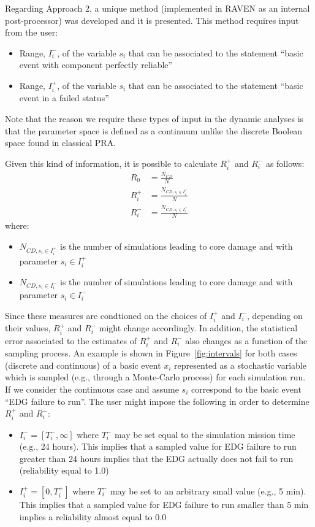 Regarding Approach 2, a unique method (implemented in RAVEN as an internal post-processor) was developed and it is 
presented. This method requires input from the user:
\begin{itemize}
  \item Range, $I_i^-$, of the variable $s_i$ that can be associated to the statement ``basic event with component perfectly reliable''
  \item Range, $I_i^+$, of the variable $s_i$ that can be associated to the statement ``basic event in a failed status''
\end{itemize}
Note that the reason we require these types of input in the dynamic analyses is that the parameter space is defined as a continuum
unlike the discrete Boolean space found in classical PRA. 

Given this kind of information, it is possible to calculate $R_i^+$ and $R_i^-$ as follows:
\begin{align} 
  R_0   &= \frac{N_{CD}}{N}  \\
  R_i^+ &= \frac{N_{CD, s_i \in I_i^+}}{N}   \\
  R_i^- &= \frac{N_{CD, s_i \in I_i^-}}{N} 
\end{align}
where:
\begin{itemize}
  \item $N_{CD, s_i \in I_i^+}$ is the number of simulations leading to core damage and with parameter $s_i \in I_i^+$
  \item $N_{CD, s_i \in I_i^-}$ is the number of simulations leading to core damage and with parameter $s_i \in I_i^-$
\end{itemize}

Since these measures are condtioned on the choices of $I_i^+$ and $I_i^-$, depending on their values, $R_i^+$ and $R_i^-$ might change accordingly. In addition, the statistical error 
associated to the estimates of $R_i^+$ and $R_i^-$ also changes as a function of the sampling process. 
An example is shown in Figure~\ref{fig:intervals} for both cases (discrete and continuous) of a basic event $x_i$ represented 
as a stochastic variable which is sampled (e.g., through a Monte-Carlo process) for each simulation run.
If we consider the continuous case and assume $s_i$ correspond to the basic event ``EDG failure to run''. 
The user might impose the following in order to determine $R_i^+$ and $R_i^-$:
\begin{itemize}
  \item $I_i^-=[T_i^-,\infty]$ where $T_i^-$ may be set equal to the simulation mission time (e.g., 24 hours). 
        This implies that a sampled value for EDG failure to run greater than 24 hours implies that the 
        EDG actually does not fail to run (reliability equal to 1.0)
  \item $I_i^+=[0,T_i^+ ]$ where $T_i^-$ may be set to an arbitrary small value (e.g., 5 min). This implies that 
        a sampled value for EDG failure to run smaller than 5 min implies a reliability almost equal to 0.0
\end{itemize}

